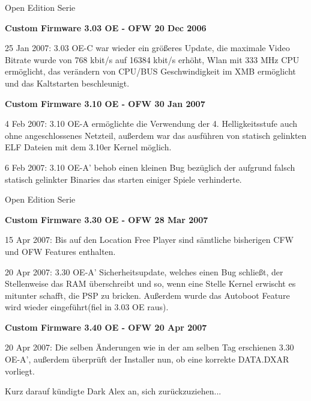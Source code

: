 \documentclass[mode=print,paper=screen,size=10pt,style=paintings]{powerdot}
\begin{document}
\begin{slide}{Open Edition Serie}
	\begin{large}\textbf{Custom Firmware 3.03 OE - OFW 20 Dec 2006}\end{large}
	\begin{list}{-}{}
		\item{25 Jan 2007: 3.03 OE-C war wieder ein größeres Update, die maximale Video Bitrate wurde von 768 kbit/s auf 
			16384 kbit/s erhöht, Wlan mit 333 MHz CPU ermöglicht, das verändern von CPU/BUS Geschwindigkeit im XMB ermöglicht
			und das Kaltstarten beschleunigt.}
	\end{list}
	\begin{large}\textbf{Custom Firmware 3.10 OE - OFW 30 Jan 2007}\end{large}
	\begin{list}{-}{}
		\item{4 Feb 2007: 3.10 OE-A ermöglichte die Verwendung der 4. Helligkeitsstufe auch ohne angeschlossenes Netzteil, 
			außerdem war das ausführen von statisch gelinkten ELF Dateien mit dem 3.10er Kernel möglich.}
		\item{6 Feb 2007: 3.10 OE-A' behob einen kleinen Bug bezüglich der aufgrund falsch statisch gelinkter Binaries das 
			starten einiger Spiele verhinderte.}
	\end{list}
\end{slide}

\begin{slide}{Open Edition Serie}
	\begin{large}\textbf{Custom Firmware 3.30 OE - OFW 28 Mar 2007}\end{large}
	\begin{list}{-}{}
		\item{15 Apr 2007: Bis auf den Location Free Player sind sämtliche bisherigen CFW und OFW Features enthalten.}
		\item{20 Apr 2007: 3.30 OE-A' Sicherheitsupdate, welches einen Bug schließt, der Stellenweise das RAM überschreibt
			und so, wenn eine Stelle Kernel erwischt es mitunter schafft, die PSP zu bricken. Außerdem wurde das Autoboot 
			Feature wird wieder eingeführt(fiel in 3.03 OE raus).}
	\end{list}
	\begin{large}\textbf{Custom Firmware 3.40 OE - OFW 20 Apr 2007}\end{large}
	\begin{list}{-}{}
		\item{20 Apr 2007: Die selben Änderungen wie in der am selben Tag erschienen 3.30 OE-A', außerdem überprüft der
			Installer nun, ob eine korrekte DATA.DXAR vorliegt.}
		
		\item{Kurz darauf kündigte Dark Alex an, sich zurückzuziehen...}
	\end{list}
\end{slide}
\end{document}
